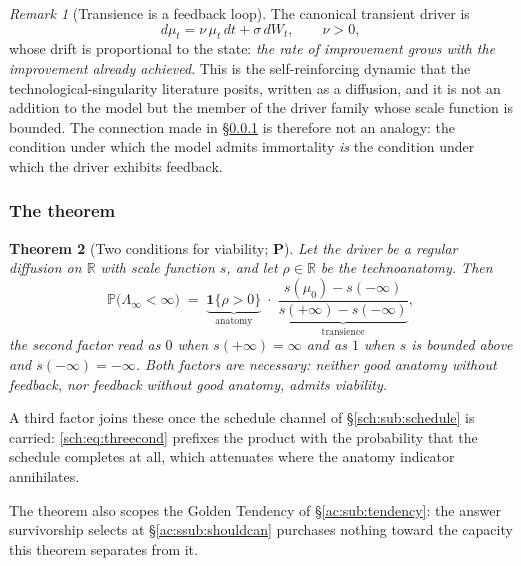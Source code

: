 \documentclass[11pt]{article}
\numberwithin{equation}{section}
\theoremstyle{plain}
\newtheorem{theorem}{Theorem}[section]
\theoremstyle{definition}
\theoremstyle{remark}
\newtheorem{remark}[theorem]{Remark}
\newcommand{\PP}{\mathbb{P}}
\newcommand{\R}{\mathbb{R}}
\newcommand{\one}{\mathbf{1}}
\begin{document}
\begin{remark}[Transience is a feedback loop]\label{gr1:rem:feedback}
The canonical transient driver is
\begin{equation}\label{gr1:eq:uou}
d\mu_t=\nu\,\mu_t\,dt+\sigma\,dW_t,\qquad \nu>0,
\end{equation}
whose drift is proportional to the state: \emph{the rate of improvement
grows with the improvement already achieved}. This is the
self-reinforcing dynamic that the technological-singularity literature
posits, written as a diffusion, and it is not an addition to the model
but the member of the driver family whose scale function is bounded.
The connection made in \S\ref{gr1:subsub:twocondthm} is therefore not an
analogy: the condition under which the model admits immortality
\emph{is} the condition under which the driver exhibits feedback.
\end{remark}

\subsubsection{The theorem}\label{gr1:subsub:twocondthm}

\begin{theorem}[Two conditions for viability; \textbf{P}]
\label{gr1:thm:twocond}
Let the driver be a regular diffusion on $\R$ with scale function $s$,
and let $\rho\in\R$ be the technoanatomy. Then
\begin{equation}\label{gr1:eq:twocond}
\PP\bigl(\Lambda_\infty<\infty\bigr)
\;=\;
\underbrace{\one\{\rho>0\}}_{\text{anatomy}}
\;\cdot\;
\underbrace{\frac{s(\mu_0)-s(-\infty)}{s(+\infty)-s(-\infty)}}
_{\text{transience}},
\end{equation}
the second factor read as $0$ when $s(+\infty)=\infty$ and as $1$ when
$s$ is bounded above and $s(-\infty)=-\infty$. Both factors are
necessary: neither good anatomy without feedback, nor feedback without
good anatomy, admits viability.
\end{theorem}

\noindent A third factor joins these once the schedule channel of
\S\ref{sch:sub:schedule} is carried: \eqref{sch:eq:threecond} prefixes
the product with the probability that the schedule completes at all, which
attenuates where the anatomy indicator annihilates.

\noindent The theorem also scopes the Golden Tendency of
\S\ref{ac:sub:tendency}: the answer survivorship selects at
\S\ref{ac:ssub:shouldcan} purchases nothing toward the capacity this
theorem separates from it.
\end{document}
